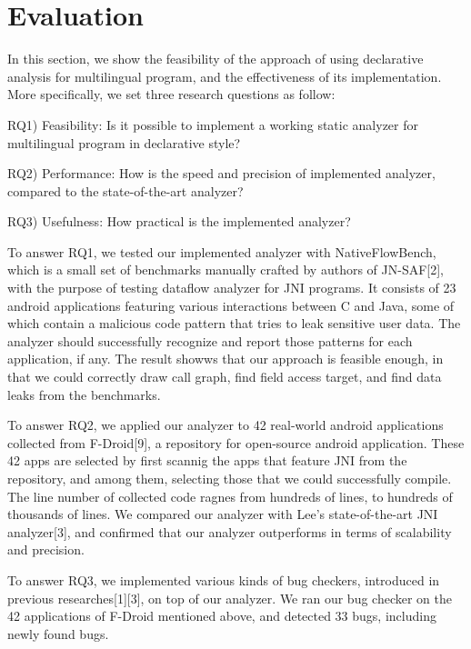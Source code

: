 \section{Evaluation}
In this section, we show the feasibility of the approach of using declarative
analysis for multilingual program, and the effectiveness of its
implementation. More specifically, we set three research questions as follow:

RQ1) Feasibility: Is it possible to implement a working static analyzer for multilingual program in declarative style?

RQ2) Performance: How is the speed and precision of implemented analyzer, compared to the state-of-the-art analyzer?

RQ3) Usefulness: How practical is the implemented analyzer?

To answer RQ1, we tested our implemented analyzer with NativeFlowBench, which
is a small set of benchmarks manually crafted by authors of JN-SAF[2], with the
purpose of testing dataflow analyzer for JNI programs. It consists of 23
android applications featuring various interactions between C and Java, some of
which contain a malicious code pattern that tries to leak sensitive user data.
The analyzer should successfully recognize and report those patterns for each
application, if any. The result showws that our approach is feasible enough,
in that we could correctly draw call graph, find field access target, and
find data leaks from the benchmarks.

To answer RQ2, we applied our analyzer to 42 real-world android applications
collected from F-Droid[9], a repository for open-source android application.
These 42 apps are selected by first scannig the apps that feature JNI from the
repository, and among them, selecting those that we could successfully compile.
The line number of collected code ragnes from hundreds of lines, to hundreds of
thousands of lines.  We compared our analyzer with Lee's state-of-the-art JNI
analyzer[3], and confirmed that our analyzer outperforms in terms of
scalability and precision.

To answer RQ3, we implemented various kinds of bug checkers, introduced in
previous researches[1][3], on top of our analyzer. We ran our bug checker on
the 42 applications of F-Droid mentioned above, and detected 33 bugs,
including  newly found bugs.

